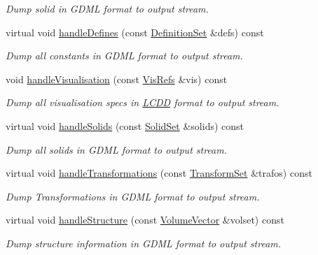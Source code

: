 \begin{DoxyCompactItemize}
\begin{DoxyCompactList}\small\item\em Dump solid in GDML format to output stream. \item\end{DoxyCompactList}\item 
virtual void \hyperlink{class_d_d4hep_1_1_geometry_1_1_simple_g_d_m_l_writer_ad1e62eccf785a9d3cd34806aa6bc2cac}{handleDefines} (const \hyperlink{class_d_d4hep_1_1_geometry_1_1_geo_handler_types_a960cd930e1a491fc9a6afa5058865b4e}{DefinitionSet} \&defs) const 
\begin{DoxyCompactList}\small\item\em Dump all constants in GDML format to output stream. \item\end{DoxyCompactList}\item 
void \hyperlink{class_d_d4hep_1_1_geometry_1_1_simple_g_d_m_l_writer_a05103edd07021ff17363f0b26bdc4a84}{handleVisualisation} (const \hyperlink{class_d_d4hep_1_1_geometry_1_1_geo_handler_types_abeb370eb52c06e48c61e6c8bc19b66ab}{VisRefs} \&vis) const 
\begin{DoxyCompactList}\small\item\em Dump all visualisation specs in \hyperlink{class_d_d4hep_1_1_geometry_1_1_l_c_d_d}{LCDD} format to output stream. \item\end{DoxyCompactList}\item 
virtual void \hyperlink{class_d_d4hep_1_1_geometry_1_1_simple_g_d_m_l_writer_a7f5910a2161e23d80f32e76df06de00a}{handleSolids} (const \hyperlink{class_d_d4hep_1_1_geometry_1_1_geo_handler_types_a85d065cdf670a4f9ea9c0c4dee921fce}{SolidSet} \&solids) const 
\begin{DoxyCompactList}\small\item\em Dump all solids in GDML format to output stream. \item\end{DoxyCompactList}\item 
virtual void \hyperlink{class_d_d4hep_1_1_geometry_1_1_simple_g_d_m_l_writer_aa29f0cbfbea29acd276be5ac39617d53}{handleTransformations} (const \hyperlink{class_d_d4hep_1_1_geometry_1_1_geo_handler_types_aa52b3113e87db04c37666e85a9b5e569}{TransformSet} \&trafos) const 
\begin{DoxyCompactList}\small\item\em Dump Transformations in GDML format to output stream. \item\end{DoxyCompactList}\item 
virtual void \hyperlink{class_d_d4hep_1_1_geometry_1_1_simple_g_d_m_l_writer_a2deafeaf88bb796a0063f746adc7025d}{handleStructure} (const \hyperlink{class_d_d4hep_1_1_geometry_1_1_geo_handler_types_a6713619ef278692ebdf9f6ee4a3f32de}{VolumeVector} \&volset) const 
\begin{DoxyCompactList}\small\item\em Dump structure information in GDML format to output stream. \item\end{DoxyCompactList}\end{DoxyCompactItemize}

